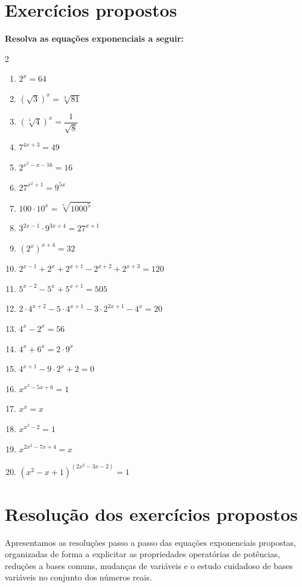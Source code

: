 \documentclass[12pt,a4paper]{report}
\begin{document}
	\section{Exercícios propostos}
	\textbf{Resolva as equações exponenciais a seguir:}
	\begin{multicols}{2}
		\begin{enumerate}
			\item $2^x=64$
			\item $\left( \sqrt{3} \right)^x = \sqrt[3]{81}$
			\item $\left( \sqrt[5]{4} \right) ^x = \dfrac{1}{\sqrt{8}}$
			\item $7^{4x+3}=49$
			\item $2^{x^2-x-16}=16$
			\item $27^{x^2+1}=9^{5x}$
			\item $100 \cdot 10^x = \sqrt[x]{1000^5}$
			\item $3^{2x-1} \cdot 9^{3x+4} = 27^{x+1}$
			\item $(2^x)^{x+4} = 32$
			\item $2^{x-1}+2^{x}+2^{x+1}-2^{x+2}+2^{x+3}=120$
			\item $5^{x-2} - 5^x + 5^{x+1} = 505$
			\item $2 \cdot 4^{x+2}-5 \cdot 4^{x+1}-3 \cdot 2^{2x+1} - 4^x = 20$
			\item $4^x-2^x=56$
			\item $4^x+6^x=2 \cdot 9^x$
			\item $4^{x+1}-9 \cdot 2^x + 2 = 0$
			\item $x^{x^2-5x+6}=1$
			\item $x^x = x$
			\item $x^{x^2-2}=1$
			\item $x^{2x^2-7x+4}=x$
			\item $(x^2- x + 1)^{(2x^2-3x-2)} = 1$
		\end{enumerate} 	
	\end{multicols}
	
\section{Resolução dos exercícios propostos}

Apresentamos as resoluções passo a passo das equações exponenciais propostas, organizadas de forma a explicitar as propriedades operatórias de potências, reduções a bases comuns, mudanças de variáveis e o estudo cuidadoso de bases variáveis no conjunto dos números reais.
\end{document}
